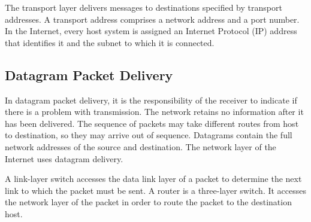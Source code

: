The transport layer delivers messages to destinations specified by transport addresses.
A transport address comprises a network address and a port number.
In the Internet, every host system is assigned an Internet Protocol (IP) address that identifies it and the subnet to which it is connected.

\subsection{Datagram Packet Delivery}

In datagram packet delivery, it is the responsibility of the receiver to indicate if there is a problem with transmission.
The network retains no information after it has been delivered.
The sequence of packets may take different routes from host to destination, so they may arrive out of sequence.
Datagrams contain the full network addresses of the source and destination.
The network layer of the Internet uses datagram delivery.

A link-layer switch accesses the data link layer of a packet to determine the next link to which the packet must be sent.
A router is a three-layer switch.
It accesses the network layer of the packet in order to route the packet to the destination host.
